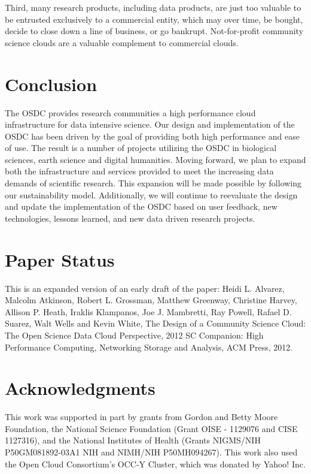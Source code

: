 \documentclass[11pt,twocolumn]{article}
\begin{document}
Third, many research products, including data products, are just
too valuable to be entrusted exclusively to a commercial entity,
which may over time, be bought, decide to close down a line of
business, or go bankrupt.  Not-for-profit community science clouds are
a valuable complement to commercial clouds.

\section{Conclusion}
The OSDC provides research communities a high performance cloud infrastructure for data intensive science. Our design and implementation of the OSDC has been driven by the goal of providing both high performance and ease of use. The result is a number of projects utilizing the OSDC in biological sciences, earth science and digital humanities. Moving forward, we plan to expand both the infrastructure and services provided to meet the increasing data demands of scientific research. This expansion will be made possible by following our sustainability model. Additionally, we will continue to reevaluate the design and update the implementation of the OSDC based on user feedback, new technologies, lessons learned, and new data driven research projects.

\section*{Paper Status}
This is an expanded version of an early draft of the paper: Heidi L. Alvarez, Malcolm Atkinson, Robert L. Grossman, Matthew Greenway, Christine Harvey, Allison P. Heath, Iraklis Klampanos, Joe J. Mambretti, Ray Powell, Rafael D. Suarez, Walt Wells and Kevin White, The Design of a Community Science Cloud: The Open Science Data Cloud Perspective, 2012 SC Companion: High Performance Computing, Networking Storage and Analysis, ACM Press, 2012. 

\section*{Acknowledgments}
This work was supported in part by grants from Gordon and Betty Moore
Foundation, the National Science Foundation (Grant OISE - 1129076 and
CISE 1127316), and the National Institutes of Health (Grants NIGMS/NIH
P50GM081892-03A1 NIH and NIMH/NIH P50MH094267).  This work also used
the Open Cloud Consortium's OCC-Y Cluster, which was donated by Yahoo!
Inc.




\end{document}
